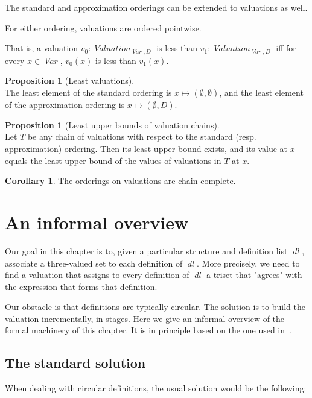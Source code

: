 \documentclass[oneside,12pt]{book}
\theoremstyle{definition}
\newtheorem{corollary}[theorem]{Corollary}
\newtheorem{proposition}[theorem]{Proposition}
\theoremstyle{remark}
\newcommand\var[1]{\mathop{\mathit{#1}}\nolimits}
\newcommand{\Var}{\var{Var}}
\newcommand{\Valuation}{\var{Valuation}}
\newcommand{\dl}{\var{dl}}
\begin{document}
The standard and approximation orderings can be extended to valuations as well.

\begin{defBox}
  For either ordering, valuations are ordered pointwise.
  
  \medskip \noindent That is, a valuation $v_0\colon \Valuation_{\Var,D}$
  is less than $v_1\colon \Valuation_{\Var,D}$ iff for every $x \in \Var$,
  $v_0(x)$ is less than $v_1(x)$.
\end{defBox}

\begin{proposition}[Least valuations]\label{leastVal} \hfill \\
  The least element of the standard ordering is
  $x \mapsto (\emptyset, \emptyset)$, and the least element of the approximation
  ordering is $x \mapsto (\emptyset, D)$.
\end{proposition}

\begin{proposition}[Least upper bounds of valuation chains]
\label{leastUpperBoundsValuations} \hfill \\
  Let $T$ be any chain of valuations with respect to the standard
  (resp. approximation) ordering. Then its least upper bound exists, and its value
  at $x$ equals the least upper bound of the values of valuations in $T$ at $x$.
\end{proposition}

\begin{corollary}\label{valChainComplete}
  The orderings on valuations are chain-complete.
\end{corollary}

\section{An informal overview}
Our goal in this chapter is to, given a particular structure and definition list
$\dl$, associate a three-valued set to each definition of $\dl$. More precisely,
we need to find a valuation that assigns to every definition of $\dl$ a triset
that "agrees" with the expression that forms that definition.

Our obstacle is that definitions are typically circular. The solution is to build
the valuation incrementally, in stages.
Here we give an informal overview of the formal machinery of this chapter.
It is in principle based on the one used in~\cite{WfSemBoolGrammar}.

\subsection{The standard solution}
When dealing with circular definitions, the usual solution would
be the following:
\end{document}
